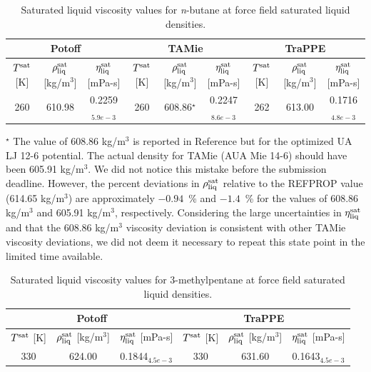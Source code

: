 \documentclass[preprint,review,11pt]{elsarticle}
\begin{document}
\begin{landscape}

	\begin{table}[H]
		\caption{Saturated liquid viscosity values for \textit{n}-butane at force field saturated liquid densities.}
		\begin{center}
			\begin{tabular}{|c|c|c|c|c|c|c|c|c|}
				\hline
				\multicolumn{3}{|c|}{Potoff}     & \multicolumn{3}{c|}{TAMie}      & \multicolumn{3}{c|}{TraPPE}            \\ \hline
				$T^{\rm sat}$ {[}K{]} & $\rho^{\rm sat}_{\rm liq}$ [kg/m$^3$] & $\eta_{\rm liq}^{\rm sat}$ {[}mPa-s{]} & $T^{\rm sat}$ {[}K{]} & $\rho^{\rm sat}_{\rm liq}$ [kg/m$^3$] & $\eta_{\rm liq}^{\rm sat}$ {[}mPa-s{]} & $T^{\rm sat}$ {[}K{]} & $\rho^{\rm sat}_{\rm liq}$ [kg/m$^3$] & $\eta_{\rm liq}^{\rm sat}$ {[}mPa-s{]} \\ \hline
				260 & 610.98 & 0.2259$_{5.9e-3}$  & 260 & 608.86$^{\star}$ & 0.2247$_{8.6e-3}$  & 262 & 613.00 & 0.1716$_{4.8e-3}$   \\ \hline
			\end{tabular}
		\end{center}
	\begin{singlespace}
	$^{\star}$ The value of 608.86 kg/m$^3$ is reported in Reference  but for the optimized UA LJ 12-6 potential. The actual density for TAMie (AUA Mie 14-6) should have been 605.91 kg/m$^3$. We did not notice this mistake before the submission deadline. However, the percent deviations in $\rho_{\rm liq}^{\rm sat}$ relative to the REFPROP value (614.65 kg/m$^3$) are approximately $-0.94$~\% and $-1.4$~\% for the values of 608.86 kg/m$^3$ and 605.91 kg/m$^3$, respectively. Considering the large uncertainties in $\eta_{\rm liq}^{\rm sat}$ and that the 608.86 kg/m$^3$ viscosity deviation is consistent with other TAMie viscosity deviations, we did not deem it necessary to repeat this state point in the limited time available.
	\end{singlespace}
	\end{table}

	\begin{table}[H]
		\caption{Saturated liquid viscosity values for 3-methylpentane at force field saturated liquid densities.}
		\begin{center}
			\begin{tabular}{|c|c|c|c|c|c|}
				\hline
				\multicolumn{3}{|c|}{Potoff}  & \multicolumn{3}{c|}{TraPPE}            \\ \hline
				$T^{\rm sat}$ {[}K{]} & $\rho^{\rm sat}_{\rm liq}$ [kg/m$^3$] & $\eta_{\rm liq}^{\rm sat}$ {[}mPa-s{]} & $T^{\rm sat}$ {[}K{]} & $\rho^{\rm sat}_{\rm liq}$ [kg/m$^3$] & $\eta_{\rm liq}^{\rm sat}$ {[}mPa-s{]} \\ \hline
				330 & 624.00 & 0.1844$_{4.5e-3}$ & 330 & 631.60 & 0.1643$_{4.5e-3}$   \\ \hline
			\end{tabular}
		\end{center}
	\end{table}


\end{landscape}
\end{document}
